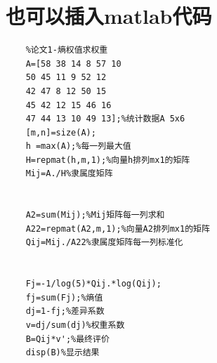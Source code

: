 \documentclass{article}
\numberwithin{equation}{subsection}
\begin{document}
\section{也可以插入matlab代码}
\begin{lstlisting}
    %论文1-熵权值求权重
    A=[58 38 14 8 57 10
    50 45 11 9 52 12
    42 47 8 12 50 15
    45 42 12 15 46 16
    47 44 13 10 49 13];%统计数据A 5x6
    [m,n]=size(A);
    h =max(A);%每一列最大值
    H=repmat(h,m,1);%向量h排列mx1的矩阵
    Mij=A./H%隶属度矩阵
    
    
    A2=sum(Mij);%Mij矩阵每一列求和
    A22=repmat(A2,m,1);%向量A2排列mx1的矩阵
    Qij=Mij./A22%隶属度矩阵每一列标准化
    
    
    Fj=-1/log(5)*Qij.*log(Qij);
    fj=sum(Fj);%熵值
    dj=1-fj;%差异系数
    v=dj/sum(dj)%权重系数
    B=Qij*v';%最终评价
    disp(B)%显示结果
    
\end{lstlisting}
\end{document}
